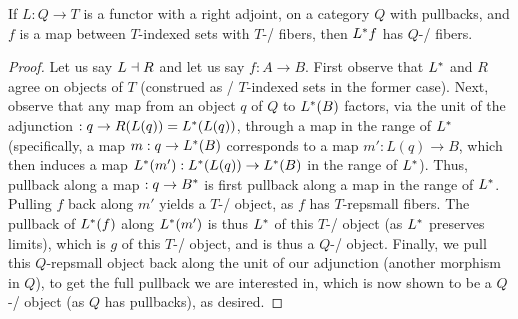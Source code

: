\begin{theorem}\label{RepSmallRightAdjointFibers}
If $L : Q \to T$ is a functor with a right adjoint, on a category $Q$ with pullbacks, and $f$ is a map between $T$-indexed sets with $T$-\repsmall/ fibers, then $L^* f$ has $Q$-\repsmall/ fibers.
\end{theorem}
\begin{proof}
Let us say $L \dashv R$ and let us say $f: A \to B$. First observe that $L^*$ and $R$ agree on objects of $T$ (construed as \repsmall/ $T$-indexed sets in the former case). Next, observe that any map from an object $q$ of $Q$ to $L^*(B)$ factors, via the unit of the adjunction $: q \to R(L(q)) = L^*(L(q))$, through a map in the range of $L^*$ (specifically, a map $m: q \to L^*(B)$ corresponds to a map $m': L(q) \to B$, which then induces a map $L^*(m'): L^*(L(q)) \to L^*(B)$ in the range of $L^*$). Thus, pullback along a map $: q \to B^*$ is first pullback along a map in the range of $L^*$. Pulling $f$ back along $m'$ yields a $T$-\repsmall/ object, as $f$ has $T$-repsmall fibers. The pullback of $L^*(f)$ along $L^*(m')$ is thus $L^*$ of this $T$-\repsmall/ object (as $L^*$ preserves limits), which is $g$ of this $T$-\repsmall/ object, and is thus a $Q$-\repsmall/ object. Finally, we pull this $Q$-repsmall object back along the unit of our adjunction (another morphism in $Q$), to get the full pullback we are interested in, which is now shown to be a $Q$-\repsmall/ object (as $Q$ has pullbacks), as desired. 
\end{proof}

